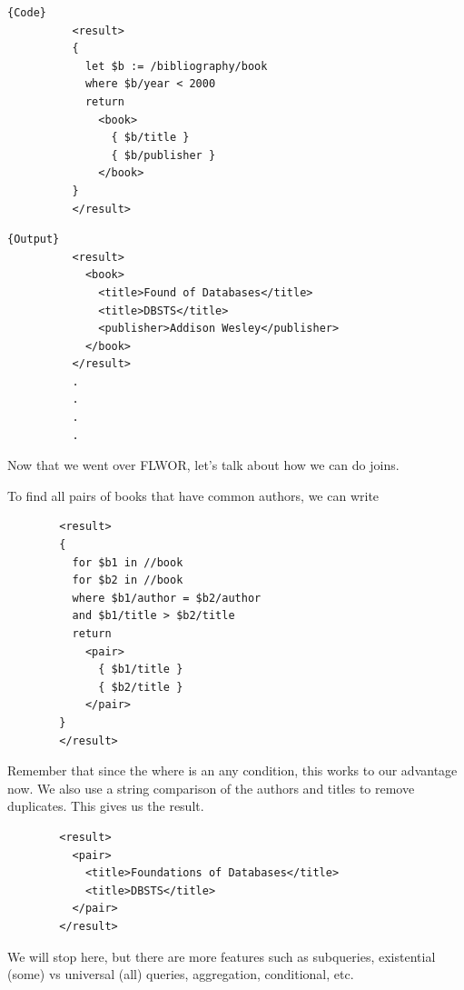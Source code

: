 \documentclass{article}
\begin{document}
\begin{example}
      \noindent\begin{minipage}{.5\textwidth}
        \begin{lstlisting}[]{Code}
          <result>
          {
            let $b := /bibliography/book
            where $b/year < 2000
            return 
              <book>
                { $b/title }
                { $b/publisher }
              </book>
          }
          </result>          
        \end{lstlisting}
        \end{minipage}
        \hfill
        \begin{minipage}{.49\textwidth}
        \begin{lstlisting}[]{Output}
          <result>
            <book>
              <title>Found of Databases</title>
              <title>DBSTS</title>
              <publisher>Addison Wesley</publisher>
            </book>
          </result>
          .
          .
          .
          .
        \end{lstlisting}
      \end{minipage}
    \end{example}

    Now that we went over FLWOR, let's talk about how we can do joins. 

    \begin{example}
      To find all pairs of books that have common authors, we can write 
      \begin{lstlisting}
        <result>
        {
          for $b1 in //book
          for $b2 in //book
          where $b1/author = $b2/author
          and $b1/title > $b2/title
          return
            <pair>
              { $b1/title }
              { $b2/title }
            </pair>
        }
        </result> 
      \end{lstlisting}
      Remember that since the where is an any condition, this works to our advantage now. We also use a string comparison of the authors and titles to remove duplicates. This gives us the result. 
      \begin{lstlisting}
        <result>
          <pair>
            <title>Foundations of Databases</title>
            <title>DBSTS</title>
          </pair>
        </result> 
      \end{lstlisting}
    \end{example}

    We will stop here, but there are more features such as subqueries, existential (some) vs universal (all) queries, aggregation, conditional, etc. 
\end{document}
